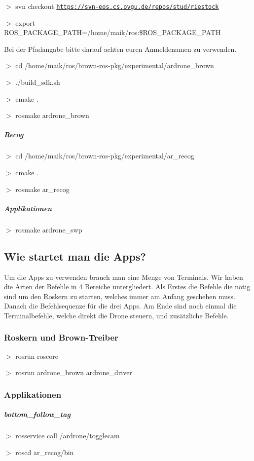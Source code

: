 $>$ svn checkout \href{https://svn-eos.cs.ovgu.de/repos/stud/riestock}{\tt https://svn-\/eos.cs.ovgu.de/repos/stud/riestock}

$>$ export ROS\_\-PACKAGE\_\-PATH=/home/maik/ros:\$ROS\_\-PACKAGE\_\-PATH

Bei der Pfadangabe bitte darauf achten euren Anmeldenamen zu verwenden.

$>$ cd /home/maik/ros/brown-\/ros-\/pkg/experimental/ardrone\_\-brown

$>$ ./build\_\-sdk.sh

$>$ cmake .

$>$ rosmake ardrone\_\-brown

\subparagraph*{Recog }

$>$ cd /home/maik/ros/brown-\/ros-\/pkg/experimental/ar\_\-recog

$>$ cmake .

$>$ rosmake ar\_\-recog

\subparagraph*{Applikationen }

$>$ rosmake ardrone\_\-swp

\subsection*{Wie startet man die Apps? }

Um die Apps zu verwenden brauch man eine Menge von Terminals. Wir haben die Arten der Befehle in 4 Bereiche untergliedert. Als Erstes die Befehle die nötig sind um den Roskern zu starten, welches immer am Anfang geschehen muss. Danach die Befehlsequenze für die drei Apps. Am Ende sind noch einmal die Terminalbefehle, welche direkt die Drone steuern, und zusätzliche Befehle.

\subsubsection*{Roskern und Brown-\/Treiber }

$>$ rosrun roscore

$>$ rosrun ardrone\_\-brown ardrone\_\-driver

\subsubsection*{Applikationen }

\subparagraph*{bottom\_\-follow\_\-tag }

$>$ rosservice call /ardrone/togglecam

$>$ roscd ar\_\-recog/bin

